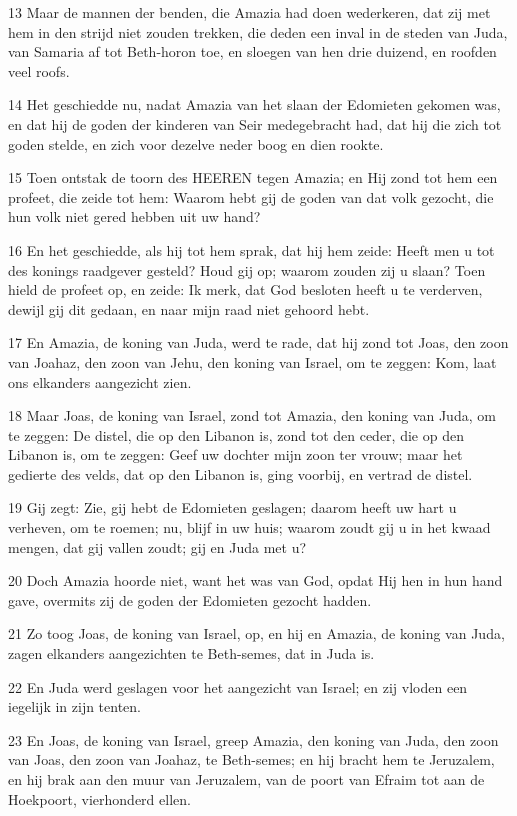 \par 13 Maar de mannen der benden, die Amazia had doen wederkeren, dat zij met hem in den strijd niet zouden trekken, die deden een inval in de steden van Juda, van Samaria af tot Beth-horon toe, en sloegen van hen drie duizend, en roofden veel roofs.
\par 14 Het geschiedde nu, nadat Amazia van het slaan der Edomieten gekomen was, en dat hij de goden der kinderen van Seir medegebracht had, dat hij die zich tot goden stelde, en zich voor dezelve neder boog en dien rookte.
\par 15 Toen ontstak de toorn des HEEREN tegen Amazia; en Hij zond tot hem een profeet, die zeide tot hem: Waarom hebt gij de goden van dat volk gezocht, die hun volk niet gered hebben uit uw hand?
\par 16 En het geschiedde, als hij tot hem sprak, dat hij hem zeide: Heeft men u tot des konings raadgever gesteld? Houd gij op; waarom zouden zij u slaan? Toen hield de profeet op, en zeide: Ik merk, dat God besloten heeft u te verderven, dewijl gij dit gedaan, en naar mijn raad niet gehoord hebt.
\par 17 En Amazia, de koning van Juda, werd te rade, dat hij zond tot Joas, den zoon van Joahaz, den zoon van Jehu, den koning van Israel, om te zeggen: Kom, laat ons elkanders aangezicht zien.
\par 18 Maar Joas, de koning van Israel, zond tot Amazia, den koning van Juda, om te zeggen: De distel, die op den Libanon is, zond tot den ceder, die op den Libanon is, om te zeggen: Geef uw dochter mijn zoon ter vrouw; maar het gedierte des velds, dat op den Libanon is, ging voorbij, en vertrad de distel.
\par 19 Gij zegt: Zie, gij hebt de Edomieten geslagen; daarom heeft uw hart u verheven, om te roemen; nu, blijf in uw huis; waarom zoudt gij u in het kwaad mengen, dat gij vallen zoudt; gij en Juda met u?
\par 20 Doch Amazia hoorde niet, want het was van God, opdat Hij hen in hun hand gave, overmits zij de goden der Edomieten gezocht hadden.
\par 21 Zo toog Joas, de koning van Israel, op, en hij en Amazia, de koning van Juda, zagen elkanders aangezichten te Beth-semes, dat in Juda is.
\par 22 En Juda werd geslagen voor het aangezicht van Israel; en zij vloden een iegelijk in zijn tenten.
\par 23 En Joas, de koning van Israel, greep Amazia, den koning van Juda, den zoon van Joas, den zoon van Joahaz, te Beth-semes; en hij bracht hem te Jeruzalem, en hij brak aan den muur van Jeruzalem, van de poort van Efraim tot aan de Hoekpoort, vierhonderd ellen.
